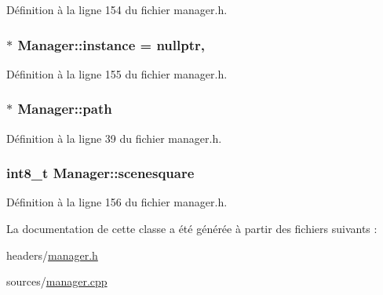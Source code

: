 Définition à la ligne 154 du fichier manager.\-h.

\hypertarget{class_manager_ac80f5ee151565f111593921bac645ad7}{
\subsubsection[{instance}]{ $\ast$ Manager\-::instance = nullptr\hspace{0.3cm}{\ttfamily [static]}, {\ttfamily [private]}}}\label{class_manager_ac80f5ee151565f111593921bac645ad7}


Définition à la ligne 155 du fichier manager.\-h.

\hypertarget{class_manager_ad9b3bf0343fe49922b1874dcb2b5c6ca}{
\subsubsection[{path}]{$\ast$ Manager\-::path}}\label{class_manager_ad9b3bf0343fe49922b1874dcb2b5c6ca}


Définition à la ligne 39 du fichier manager.\-h.

\hypertarget{class_manager_aee110fd8a198d0355c0475e2a8b64380}{
\subsubsection[{scenesquare}]{\setlength{\rightskip}{0pt plus 5cm}int8\-\_\-t Manager\-::scenesquare\hspace{0.3cm}{\ttfamily [private]}}}\label{class_manager_aee110fd8a198d0355c0475e2a8b64380}


Définition à la ligne 156 du fichier manager.\-h.



La documentation de cette classe a été générée à partir des fichiers suivants \-:\begin{DoxyCompactItemize}
\item 
headers/\hyperlink{manager_8h}{manager.\-h}\item 
sources/\hyperlink{manager_8cpp}{manager.\-cpp}\end{DoxyCompactItemize}
